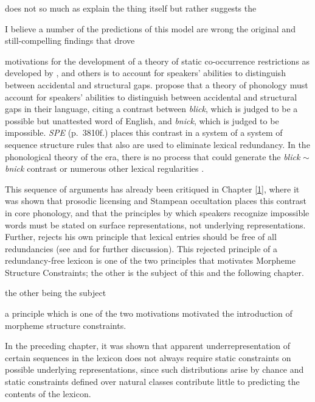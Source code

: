 does not so much as explain the thing itself but rather suggests the

I believe a number of the predictions of this model are wrong
the original and still-compelling 
findings that drove 

 motivations for the development of a theory of static co-occurrence restrictions as developed by \citet{SPR}, \citet{Stanley1967} and others is to account for speakers' abilities to distinguish between accidental and structural gaps. \citet{Chomsky1965} propose that a theory of phonology must account for speakers' abilities to distinguish between accidental and structural gaps in their language, citing a contrast between \emph{blick}, which is judged to be a possible but unattested word of English, and \emph{bnick}, which is judged to be impossible. \emph{SPE} (p.~3810f.) places this contrast in a system of a system of sequence structure rules that also are used to eliminate lexical redundancy. In the phonological theory of the era, there is no process that could generate the \emph{blick} $\sim$ \emph{bnick} contrast or numerous other lexical regularities \citep[][283f.]{Anderson1974}.

This sequence of arguments has already been critiqued in Chapter \ref{1}, where it was shown that prosodic licensing and Stampean occultation places this contrast in core phonology, and that the principles by which speakers recognize impossible words must be stated on surface representations, not underlying representations. Further, \citet[][528f.]{Halle1975} rejects his own principle that lexical entries should be free of all redundancies (see \citealt[][201]{Reiss2003a} and \citealt{Vaux2003} for further discussion). This rejected principle of a redundancy-free lexicon is one of the two principles that motivates Morpheme Structure Constraints; the other is the subject of this and the following chapter.

the other being the subject 


a principle which is one of the two motivations  motivated the introduction of morpheme structure constraints.

In the preceding chapter, it was shown that apparent underrepresentation of certain sequences in the lexicon does not always require static constraints on possible underlying representations, since such distributions arise by chance and static constraints defined over natural classes contribute little to predicting the contents of the lexicon. 

